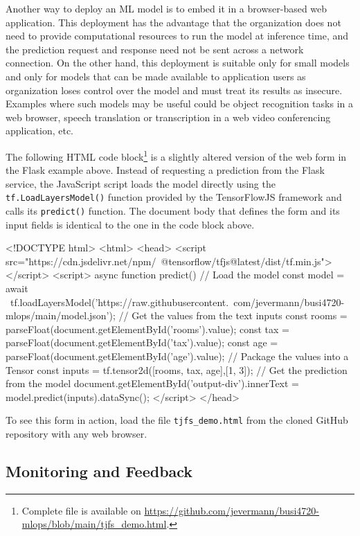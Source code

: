 \begin{withcode}
Another way to deploy an ML model is to embed it in a browser-based web application. This deployment has the advantage that the organization does not need to provide computational resources to run the model at inference time, and the prediction request and response need not be sent across a network connection. On the other hand, this deployment is suitable only for small models and only for models that can be made available to application users as organization loses control over the model and must treat its results as insecure. Examples where such models may be useful could be object recognition tasks in a web browser, speech translation or transcription in a web video conferencing application, etc. 

The following HTML code block\footnote{Complete file is available on \url{https://github.com/jevermann/busi4720-mlops/blob/main/tjfs_demo.html}.} is a slightly altered version of the web form in the Flask example above. Instead of requesting a prediction from the Flask service, the JavaScript script loads the model directly using the \texttt{tf.LoadLayersModel()} function provided by the TensorFlowJS framework and calls its \texttt{predict()} function. The document body that defines the form and its input fields is identical to the one in the code block above. 

\begin{htmlcode}
<!DOCTYPE html>
<html>
 <head>
  <script src="https://cdn.jsdelivr.net/npm/\
     @tensorflow/tfjs@latest/dist/tf.min.js"></script>
  <script>
   async function predict() {
    // Load the model
    const model = await \
     tf.loadLayersModel('https://raw.githubusercontent.\
      com/jevermann/busi4720-mlops/main/model.json');
    // Get the values from the text inputs
    const rooms = parseFloat(document.getElementById('rooms').value);
    const tax = parseFloat(document.getElementById('tax').value);
    const age = parseFloat(document.getElementById('age').value);
    // Package the values into a Tensor
    const inputs = tf.tensor2d([rooms, tax, age],[1, 3]);
    // Get the prediction from the model
    document.getElementById('output-div').innerText = 
     model.predict(inputs).dataSync();
   }
  </script>
 </head>
\end{htmlcode}

To see this form in action, load the file \texttt{tjfs\_demo.html} from the cloned GitHub repository with any web browser.
\end{withcode}

\subsection{Monitoring and Feedback}

